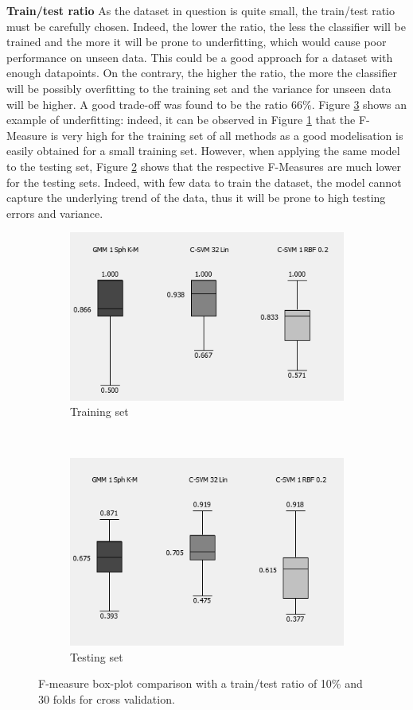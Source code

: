 \documentclass[a4paper,10pt]{article}
\begin{document}
\textbf{Train/test ratio}
As the dataset in question is quite small, the train/test ratio must be carefully chosen. Indeed, the lower the ratio, the less the classifier will be trained and the more it will be prone to underfitting, which would cause poor performance on unseen data. This could be a good approach for a dataset with enough datapoints. On the contrary, the higher the ratio, the more the classifier will be possibly overfitting to the training set and the variance for unseen data will be higher. A good trade-off was found to be the ratio $66\%$. Figure \ref{fig:robustness-train-ratio} shows an example of underfitting: indeed, it can be observed in Figure \ref{fig:train-test-ratio-low-10percent-train-data} that the F-Measure is very high for the training set of all methods as a good modelisation is easily obtained for a small training set. However, when applying the same model to the testing set, Figure \ref{fig:train-test-ratio-low-10percent-test-data} shows that the respective F-Measures are much lower for the testing sets. Indeed, with few data to train the dataset, the model cannot capture the underlying trend of the data, thus it will be prone to high testing errors and variance.

\begin{figure}[H]
\centering
	\begin{subfigure}[t]{0.3\textwidth} 
      \centering
      \includegraphics[height=3.2 cm]{pictures/train-test-ratio-low-10percent-train-data}
      \caption{Training set}
      \label{fig:train-test-ratio-low-10percent-train-data}
    \end{subfigure}%
    ~
    \begin{subfigure}[t]{0.3\textwidth} 
      \centering
      \includegraphics[height=3.2 cm]{pictures/train-test-ratio-low-10percent-test-data}
      \caption{Testing set}
      \label{fig:train-test-ratio-low-10percent-test-data}
     \end{subfigure}

     \caption{F-measure box-plot comparison with a train/test ratio of 10\% and 30 folds for cross validation.}
     \label{fig:robustness-train-ratio}
\end{figure}
\end{document}
